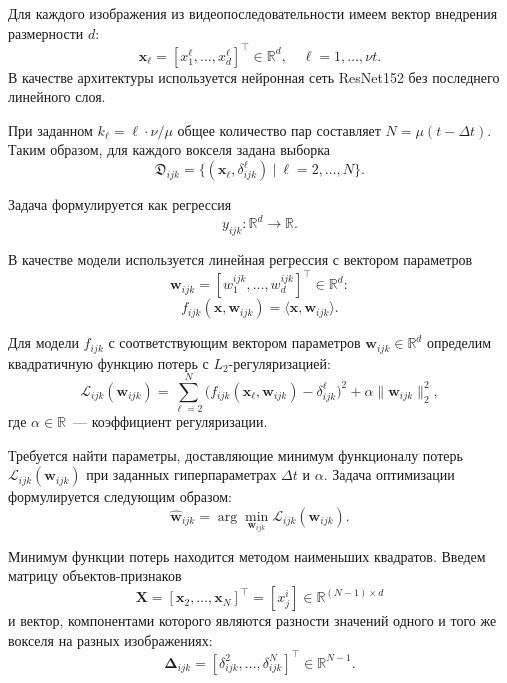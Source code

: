 Для каждого изображения из видеопоследовательности имеем вектор внедрения размерности $d$:
\[
    \mathbf{x}_{\ell} = [x^{\ell}_1, \ldots, x^{\ell}_{d}]^\top \in \mathbb{R}^{d}, \quad \ell = 1, \ldots, \nu t.
\]
В качестве архитектуры используется нейронная сеть ResNet152 без последнего линейного слоя.

При заданном $k_{\ell} = \ell \cdot \nu / \mu$ общее количество пар составляет $N = \mu (t - \Delta t)$.
Таким образом, для каждого вокселя задана выборка
\[
    \mathfrak{D}_{ijk} = \{(\mathbf{x}_{\ell}, \delta^{\ell}_{ijk}) \ | \ \ell = 2, \ldots, N \}.
\]

Задача формулируется как регрессия
\begin{equation}\label{eq6}
	y_{ijk}: \mathbb{R}^{d} \to \mathbb{R}.
\end{equation}

В качестве модели используется линейная регрессия с вектором параметров
\[
    \mathbf{w}_{ijk} = [w^{ijk}_1, \ldots, w^{ijk}_{d}]^\top \in \mathbb{R}^{d}:
\]
\begin{equation}
	\label{eq7}
	f_{ijk}(\mathbf{x}, \mathbf{w}_{ijk}) = \langle \mathbf{x}, \mathbf{w}_{ijk} \rangle.
\end{equation}

Для модели $f_{ijk}$ с соответствующим вектором параметров $\mathbf{w}_{ijk} \in \mathbb{R}^{d}$ определим квадратичную функцию потерь с $L_2$-регуляризацией:
\begin{equation}
	\label{eq8}
	\mathcal{L}_{ijk}(\mathbf{w}_{ijk}) = \sum\limits_{\ell = 2}^{N} \big(f_{ijk}(\mathbf{x}_{\ell}, \mathbf{w}_{ijk}) - \delta^{\ell}_{ijk}\big)^2 + \alpha \| \mathbf{w}_{ijk} \|_2^2,
\end{equation}
где $\alpha \in \mathbb{R}$~--- коэффициент регуляризации.

Требуется найти параметры, доставляющие минимум функционалу потерь $\mathcal{L}_{ijk}(\mathbf{w}_{ijk})$ при заданных гиперпараметрах $\Delta t$ и $\alpha$.
Задача оптимизации формулируется следующим образом:
\begin{equation}
	\label{eq9}
	\hat{\mathbf{w}}_{ijk} = \arg\min_{\mathbf{w}_{ijk}} \mathcal{L}_{ijk}(\mathbf{w}_{ijk}).
\end{equation}

Минимум функции потерь находится методом наименьших квадратов.
Введем матрицу объектов-признаков
\begin{equation}
	\label{eq10}
	\mathbf{X} = [\mathbf{x}_2, \ldots, \mathbf{x}_N]^\top = [x^i_j] \in \mathbb{R}^{(N-1) \times d}
\end{equation}
и вектор, компонентами которого являются разности значений одного и того же вокселя на разных изображениях:
\begin{equation}
	\label{eq11}
	\mathbf{\Delta}_{ijk} = [\delta^2_{ijk}, \ldots, \delta^N_{ijk}]^\top \in \mathbb{R}^{N-1}.
\end{equation}

